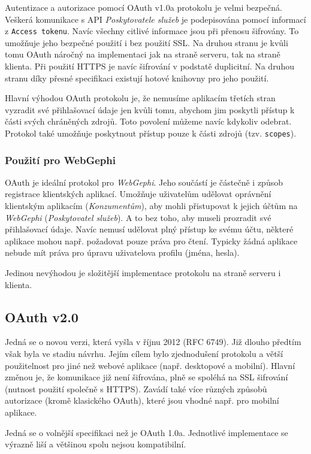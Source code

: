 \documentclass[thesis=M,czech]{FITthesis}[2014/05/6]
\begin{document}
Autentizace a autorizace pomocí OAuth v1.0a protokolu je velmi bezpečná. Veškerá komunikace s API \textit{Poskytovatele služeb} je podepisována pomocí informací z 
\texttt{Access tokenu}. Navíc všechny citlivé informace jsou při přenosu šifrovány. To umožňuje jeho bezpečné použití i bez použití SSL. Na druhou stranu je kvůli tomu OAuth náročný na implementaci 
jak na straně serveru, tak na straně klienta. Při použití HTTPS je navíc šifrování v podstatě duplicitní. Na druhou stranu díky přesné specifikaci existují hotové knihovny pro jeho použití.

Hlavní výhodou OAuth protokolu je, že nemusíme aplikacím třetích stran vyzradit své přihlašovací údaje jen kvůli tomu, abychom jim poskytli přístup k části svých chráněných zdrojů. Toto povolení můžeme navíc
kdykoliv odebrat. Protokol také umožňuje poskytnout přístup pouze k části zdrojů (tzv. \texttt{scopes}).

\subsubsection{Použití pro WebGephi}
OAuth je ideální protokol pro \textit{WebGephi}. Jeho součástí je částečně i způsob registrace klientských aplikací. Umožňuje uživatelům udělovat oprávnění klientským aplikacím (\textit{Konzumentům}), aby mohli 
přistupovat k jejich účtům na \textit{WebGephi} (\textit{Poskytovatel služeb}). A to bez toho, aby museli prozradit své přihlašovací údaje. Navíc nemusí udělovat plný přístup
ke svému účtu, některé aplikace mohou např. požadovat pouze práva pro čtení. Typicky žádná aplikace nebude mít práva pro úpravu uživatelova profilu (jména, hesla).

Jedinou nevýhodou je složitější implementace protokolu na straně serveru i klienta.

\subsection{OAuth v2.0\cite{oauth:v2}}
Jedná se o novou verzi, která vyšla v říjnu 2012 (RFC 6749). Již dlouho předtím však byla ve stadiu návrhu. Jejím cílem bylo zjednodušení protokolu
a větší použitelnost pro jiné než webové aplikace (např. desktopové a mobilní). Hlavní změnou je, že komunikace již není šifrována, plně se spoléhá na SSL šifrování
(nutnost použití společně s HTTPS). Zavádí také více různých způsobů autorizace (kromě klasického  OAuth), které jsou vhodné např. pro mobilní aplikace.

Jedná se o volnější specifikaci než je OAuth 1.0a. Jednotlivé implementace se výrazně liší a většinou spolu nejsou kompatibilní.
\end{document}
